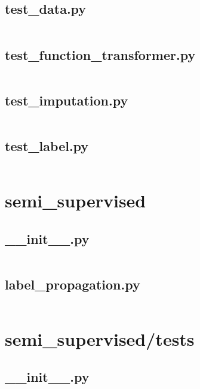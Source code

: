 \documentclass{article}
\begin{document}
\subsection{test\_data.py}
\inputminted{python}{/home/dufferzafar/dev/@clones/scikit-learn/sklearn/preprocessing/tests/test_data.py}
\newpage

\subsection{test\_function\_transformer.py}
\inputminted{python}{/home/dufferzafar/dev/@clones/scikit-learn/sklearn/preprocessing/tests/test_function_transformer.py}
\newpage

\subsection{test\_imputation.py}
\inputminted{python}{/home/dufferzafar/dev/@clones/scikit-learn/sklearn/preprocessing/tests/test_imputation.py}
\newpage

\subsection{test\_label.py}
\inputminted{python}{/home/dufferzafar/dev/@clones/scikit-learn/sklearn/preprocessing/tests/test_label.py}
\newpage

\section{semi\_supervised}

\subsection{\_\_init\_\_.py}
\inputminted{python}{/home/dufferzafar/dev/@clones/scikit-learn/sklearn/semi_supervised/__init__.py}
\newpage

\subsection{label\_propagation.py}
\inputminted{python}{/home/dufferzafar/dev/@clones/scikit-learn/sklearn/semi_supervised/label_propagation.py}
\newpage

\section{semi\_supervised/tests}

\subsection{\_\_init\_\_.py}
\inputminted{python}{/home/dufferzafar/dev/@clones/scikit-learn/sklearn/semi_supervised/tests/__init__.py}
\newpage
\end{document}
